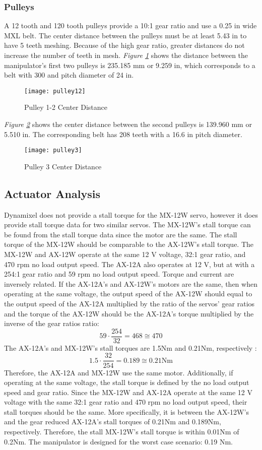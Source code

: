 \subsubsection{Pulleys}
A 12 tooth and 120 tooth pulleys provide a 10:1 gear ratio and use a 0.25 in wide MXL belt. The center distance between the pulleys must be at least 5.43 in to have 5 teeth meshing. Because of the high gear ratio, greater distances do not increase the number of teeth in mesh. \emph{Figure \ref{fig:pulley12}} shows the distance between the manipulator’s first two pulleys is 235.185 mm or 9.259 in, which corresponds to a belt with 300 and pitch diameter of 24 in.
\begin{figure}[htp]
  \center
  \texttt{[image: pulley12]}
  \caption{Pulley 1-2 Center Distance}
  \label{fig:pulley12}
\end{figure}
\emph{Figure \ref{fig:pulley3}} shows the center distance between the second pulleys is 139.960 mm or 5.510 in. The corresponding belt has 208 teeth with a 16.6 in pitch diameter.
\begin{figure}[htp]
  \center
  \texttt{[image: pulley3]}
  \caption{Pulley 3 Center Distance}
  \label{fig:pulley3}
\end{figure}
\subsection{Actuator Analysis}
Dynamixel does not provide a stall torque for the MX-12W servo, however it does provide stall torque data for two similar servos. The MX-12W’s stall torque can be found from the stall torque data since the motor are the same. The stall torque of the MX-12W should be comparable to the AX-12W’s stall torque. The MX-12W and AX-12W operate at the same 12 V voltage, 32:1 gear ratio, and 470 rpm no load output speed. The AX-12A also operates at 12 V, but at with a 254:1 gear ratio and 59 rpm no load output speed. Torque and current are inversely related. If the AX-12A’s and AX-12W’s motors are the same, then when operating at the same voltage, the output speed of the AX-12W should equal to the output speed of the AX-12A multiplied by the ratio of the servos’ gear ratios and the torque of the AX-12W should be the AX-12A’s torque multiplied by the inverse of the gear ratios ratio:
\[ 59\cdot\frac{254}{32}=468 \cong 470 \]
The AX-12A’s and MX-12W’s stall torques are 1.5Nm and 0.21Nm, respectively \cite{dyna}:
\[ 1.5\cdot\frac{32}{254}=0.189\cong0.21\text{Nm} \]
Therefore, the AX-12A and MX-12W use the same motor. Additionally, if operating at the same voltage, the stall torque is defined by the no load output speed and gear ratio. Since the MX-12W and AX-12A operate at the same 12 V voltage with the same 32:1 gear ratio and 470 rpm no load output speed, their stall torques should be the same. More specifically, it is between the AX-12W’s and the gear reduced AX-12A’s stall torques of 0.21Nm and 0.189Nm, respectively. Therefore, the stall MX-12W’s stall torque is within 0.01Nm of 0.2Nm. The manipulator is designed for the worst case scenario: 0.19 Nm.

